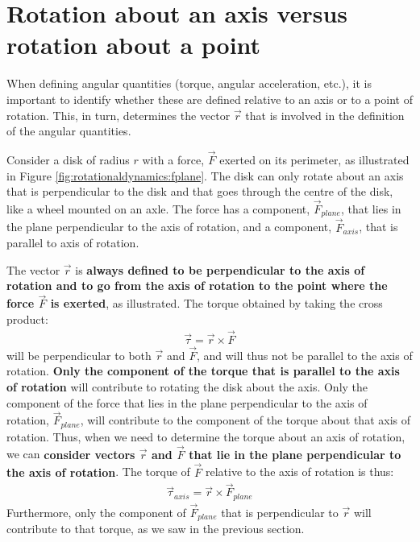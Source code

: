 \section{Rotation about an axis versus rotation about a point}
When defining angular quantities (torque, angular acceleration, etc.), it is important to identify whether these are defined relative to an axis or to a point of rotation. This, in turn, determines the vector $\vec r$ that is involved in the definition of the angular quantities.

Consider a disk of radius $r$ with a force, $\vec F$ exerted on its perimeter, as illustrated in Figure \ref{fig:rotationaldynamics:fplane}. The disk can only rotate about an axis that is perpendicular to the disk and that goes through the centre of the disk, like a wheel mounted on an axle. The force has a component, $\vec F_{plane}$, that lies in the plane perpendicular to the axis of rotation, and a component, $\vec F_{axis}$, that is parallel to axis of rotation.

The vector $\vec r$ is  \textbf{always defined to be perpendicular to the axis of rotation and to go from the axis of rotation to the point where the force $\vec F$ is exerted}, as illustrated. The torque obtained by taking the cross product:
\begin{align*}
\vec \tau = \vec r \times \vec F
\end{align*}
will be perpendicular to both $\vec r$ and $\vec F$, and will thus not be parallel to the axis of rotation. \textbf{Only the component of the torque that is parallel to the axis of rotation} will contribute to rotating the disk about the axis. Only the component of the force that lies in the plane perpendicular to the axis of rotation, $\vec F_{plane}$, will contribute to the component of the torque about that axis of rotation. Thus, when we need to determine the torque about an axis of rotation, we can \textbf{consider vectors $\vec r$ and $\vec F$ that lie in the plane perpendicular to the axis of rotation}. The torque of $\vec F$ relative to the axis of rotation is thus:
\begin{align*}
\vec \tau_{axis} = \vec r \times \vec F_{plane}
\end{align*}
Furthermore, only the component of $\vec F_{plane}$ that is perpendicular to $\vec r$ will contribute to that torque, as we saw in the previous section. 

